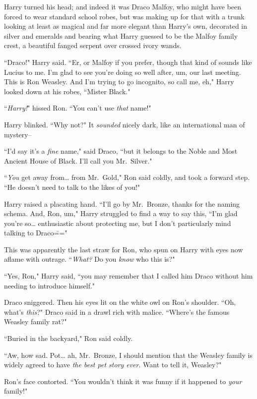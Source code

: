 Harry turned his head; and indeed it was Draco Malfoy, who might have been forced to wear standard school robes, but was making up for that with a trunk looking at least as magical and far more elegant than Harry's own, decorated in silver and emeralds and bearing what Harry guessed to be the Malfoy family crest, a beautiful fanged serpent over crossed ivory wands.

``Draco!" Harry said. ``Er, or Malfoy if you prefer, though that kind of sounds like Lucius to me. I'm glad to see you're doing so well after, um, our last meeting. This is Ron Weasley. And I'm trying to go incognito, so call me, eh," Harry looked down at his robes, ``Mister Black."

``\emph{Harry!}" hissed Ron. ``You can't use \emph{that} name!"

Harry blinked. ``Why not?" It \emph{sounded} nicely dark, like an international man of mystery\---

``I'd say it's a \emph{fine} name," said Draco, ``but it belongs to the Noble and Most Ancient House of Black. I'll call you Mr.~Silver."

``\emph{You} get away from{\ldots} from Mr.~Gold," Ron said coldly, and took a forward step. ``He doesn't need to talk to the likes of you!"

Harry raised a placating hand. ``I'll go by Mr.~Bronze, thanks for the naming schema. And, Ron, um," Harry struggled to find a way to say this, ``I'm glad you're so{\ldots} enthusiastic about protecting me, but I don't particularly mind talking to Draco\==="

This was apparently the last straw for Ron, who spun on Harry with eyes now aflame with outrage. ``\emph{What?} Do you \emph{know} who this is?"

``Yes, Ron," Harry said, ``you may remember that I called him Draco without him needing to introduce himself."

Draco sniggered. Then his eyes lit on the white owl on Ron's shoulder. ``Oh, what's \emph{this}?" Draco said in a drawl rich with malice. ``Where's the famous Weasley family rat?"

``Buried in the backyard," Ron said coldly.

``Aw, how sad. Pot{\ldots} ah, Mr.~Bronze, I should mention that the Weasley family is widely agreed to have \emph{the best pet story ever}. Want to tell it, Weasley?"

Ron's face contorted. ``You wouldn't think it was funny if it happened to \emph{your} family!"


